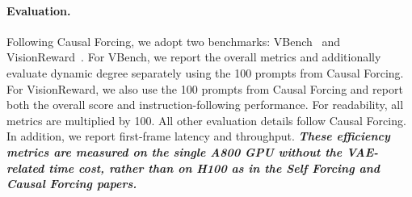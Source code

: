 \documentclass{llmxive}
\begin{document}
\paragraph{Evaluation.} Following Causal Forcing, we adopt two benchmarks: VBench~\cite{huang2024vbench} and VisionReward~\cite{xu2024visionreward}. For VBench, we report the overall metrics and additionally evaluate dynamic degree separately using the 100 prompts from Causal Forcing. For VisionReward, we also use the 100 prompts from Causal Forcing and report both the overall score and instruction-following performance. For readability, all metrics are multiplied by 100. All other evaluation details follow Causal Forcing. In addition, we report first-frame latency and throughput. \textit{\textbf{These efficiency metrics are measured \emph{on the single A800 GPU without the VAE-related time cost}, rather than on H100 as in the Self Forcing and Causal Forcing papers.}}
\end{document}

